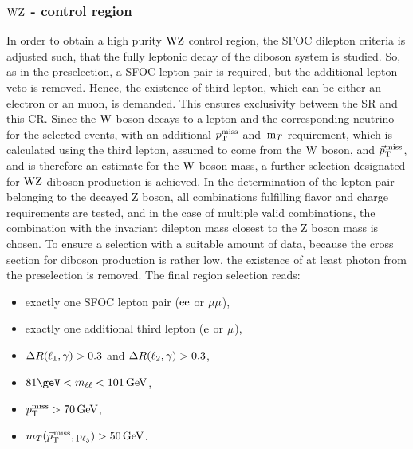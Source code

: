 \subsubsection*{$\mathrm{W}\mathrm{Z}$ - control region}
In order to obtain a high purity $\mathrm{W}\mathrm{Z}$ control region, the SFOC dilepton criteria is adjusted such, that the fully leptonic decay of the diboson system is studied. So, as in the preselection, a SFOC lepton pair is required, but the additional lepton veto is removed. Hence, the existence of third lepton, which can be either an electron or an muon, is demanded. This ensures exclusivity between the SR and this CR. Since the $\mathrm{W}$ boson decays to a lepton and the corresponding neutrino for the selected events, with an additional $p_{\mathrm{T}}^\text{miss}$ and $\,\text{m}_{T}$ requirement, which is calculated using the third lepton, assumed to come from the $\mathrm{W}$ boson, and ${\vec p}_{\mathrm{T}}^{\kern1pt\text{miss}}$, and is therefore an estimate for the $\mathrm{W}$ boson mass, a further selection designated for $\mathrm{W}\mathrm{Z}$ diboson production is achieved. In the determination of the lepton pair belonging to the decayed Z boson, all combinations fulfilling flavor and charge requirements are tested, and in the case of multiple valid combinations, the combination with the invariant dilepton mass closest to the Z boson mass is chosen. To ensure a selection with a suitable amount of data, because the cross section for diboson production is rather low, the existence of at least photon from the preselection is removed. The final region selection reads:
\begin{itemize}
 \item exactly one SFOC lepton pair ($\mathrm{e}\mathrm{e}$ or $\mu\mu$),
 \item exactly one additional third lepton ($\mathrm{e}$ or ${\mu}$),
 \item $\Delta R(\ell_1,\gamma)>0.3$ and $\Delta R(\ell_2,\gamma)>0.3$,
 \item $81\geV<m_{\ell\ell}<101\GeV$,
 \item $p_{\mathrm{T}}^\text{miss}>70\,\text{Ge\hspace{-.08em}V}$,
 \item $m_{T}({\vec p}_{\mathrm{T}}^{\kern1pt\text{miss}},\mathrm{p_{\ell_3}})>50\,\text{Ge\hspace{-.08em}V}$.
\end{itemize}
